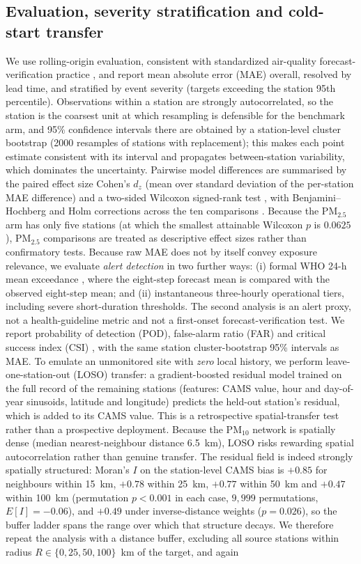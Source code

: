 \documentclass[review,times,authoryear]{elsarticle}
\newcommand*{\pmtf}{\ensuremath{\mathrm{PM_{2.5}}}}
\newcommand*{\pmten}{\ensuremath{\mathrm{PM_{10}}}}
\begin{document}
\subsection{Evaluation, severity stratification and cold-start transfer}
We use rolling-origin evaluation, consistent with standardized air-quality forecast-verification practice \citep{vitali2023}, and report mean absolute error (MAE) overall, resolved by lead time, and stratified by event severity (targets exceeding the station 95th percentile). Observations within a station are strongly autocorrelated, so the station is the coarsest unit at which resampling is defensible for the benchmark arm, and 95\% confidence intervals there are obtained by a station-level cluster bootstrap \citep{efron1979} (2000 resamples of stations with replacement); this makes each point estimate consistent with its interval and propagates between-station variability, which dominates the uncertainty. Pairwise model differences are summarised by the paired effect size Cohen's $d_z$ (mean over standard deviation of the per-station MAE difference) and a two-sided Wilcoxon signed-rank test \citep{wilcoxon1945}, with Benjamini--Hochberg and Holm corrections across the ten comparisons \citep{benjamini1995}. Because the \pmtf{} arm has only five stations (at which the smallest attainable Wilcoxon $p$ is $0.0625$), \pmtf{} comparisons are treated as descriptive effect sizes rather than confirmatory tests. Because raw MAE does not by itself convey exposure relevance, we evaluate \emph{alert detection} in two further ways: (i) formal WHO 24-h mean exceedance \citep{whoaqg2021}, where the eight-step forecast mean is compared with the observed eight-step mean; and (ii) instantaneous three-hourly operational tiers, including severe short-duration thresholds. The second analysis is an alert proxy, not a health-guideline metric and not a first-onset forecast-verification test. We report probability of detection (POD), false-alarm ratio (FAR) and critical success index (CSI) \citep{fawcett2006}, with the same station cluster-bootstrap 95\% intervals as MAE. To emulate an unmonitored site with \emph{zero} local history, we perform leave-one-station-out (LOSO) transfer: a gradient-boosted residual model trained on the full record of the remaining stations (features: CAMS value, hour and day-of-year sinusoids, latitude and longitude) predicts the held-out station's residual, which is added to its CAMS value. This is a retrospective spatial-transfer test rather than a prospective deployment. Because the \pmten{} network is spatially dense (median nearest-neighbour distance 6.5~km), LOSO risks rewarding spatial autocorrelation rather than genuine transfer. The residual field is indeed strongly spatially structured: Moran's $I$ on the station-level CAMS bias is $+0.85$ for neighbours within 15~km, $+0.78$ within 25~km, $+0.77$ within 50~km and $+0.47$ within 100~km (permutation $p<0.001$ in each case, $9{,}999$ permutations, $E[I]=-0.06$), and $+0.49$ under inverse-distance weights ($p=0.026$), so the buffer ladder spans the range over which that structure decays. We therefore repeat the analysis with a distance buffer, excluding all source stations within radius $R\in\{0,25,50,100\}$~km of the target, and again 
\end{document}
